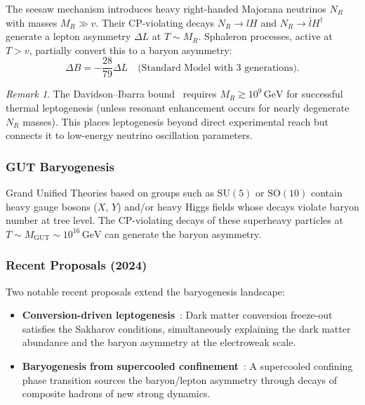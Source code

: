 \documentclass[12pt]{article}
\theoremstyle{definition}
\theoremstyle{remark}
\newtheorem{remark}[theorem]{Remark}
\newcommand{\GeV}{\,\text{GeV}}
\begin{document}
The seesaw mechanism introduces heavy right-handed Majorana neutrinos $N_R$ with
masses $M_R \gg v$. Their CP-violating decays $N_R \to l H$ and $N_R \to \bar{l} H^\dagger$
generate a lepton asymmetry $\Delta L$ at $T \sim M_R$. Sphaleron processes, active at
$T > v$, partially convert this to a baryon asymmetry:
\begin{equation}
\Delta B = -\frac{28}{79} \Delta L \quad \text{(Standard Model with 3 generations)}.
\end{equation}

\begin{remark}
The Davidson--Ibarra bound~\cite{DavidsonIbarra2002} requires $M_R \gtrsim 10^9\GeV$
for successful thermal leptogenesis (unless resonant enhancement occurs for nearly
degenerate $N_R$ masses). This places leptogenesis beyond direct experimental reach
but connects it to low-energy neutrino oscillation parameters.
\end{remark}

\subsubsection{GUT Baryogenesis}

Grand Unified Theories based on groups such as $\text{SU}(5)$ or $\text{SO}(10)$
contain heavy gauge bosons ($X$, $Y$) and/or heavy Higgs fields whose decays
violate baryon number at tree level. The CP-violating decays of these superheavy
particles at $T \sim M_{\text{GUT}} \sim 10^{16}\GeV$ can generate the baryon
asymmetry.

\subsubsection{Recent Proposals (2024)}

Two notable recent proposals extend the baryogenesis landscape:
\begin{itemize}
    \item \textbf{Conversion-driven leptogenesis}~\cite{ConversionDriven2024}:
    Dark matter conversion freeze-out satisfies the Sakharov conditions, simultaneously
    explaining the dark matter abundance and the baryon asymmetry at the electroweak scale.

    \item \textbf{Baryogenesis from supercooled confinement}~\cite{SupercooledConfinement2024}:
    A supercooled confining phase transition sources the baryon/lepton asymmetry through
    decays of composite hadrons of new strong dynamics.
\end{itemize}
\end{document}
